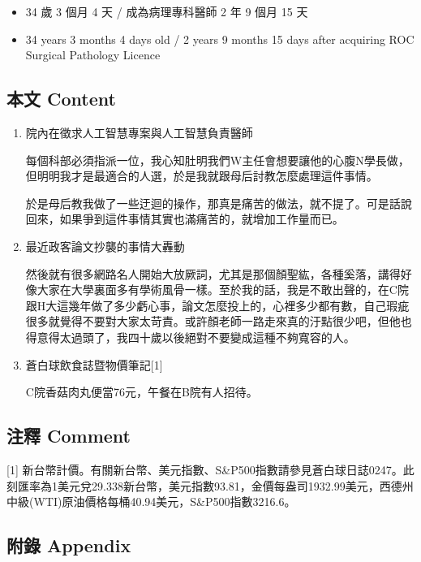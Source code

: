 \documentclass[a5paper, 11pt
]{book}
\providecommand{\tightlist}{%
  \setlength{\itemsep}{0pt}\setlength{\parskip}{0pt}}
\begin{document}
\begin{itemize}
\tightlist
\item
  34 歲 3 個月 4 天 / 成為病理專科醫師 2 年 9 個月 15 天
\item
  34 years 3 months 4 days old / 2 years 9 months 15 days after
  acquiring ROC Surgical Pathology Licence
\end{itemize}

\hypertarget{ux672cux6587-content-56}{%
\subsection{本文 Content}\label{ux672cux6587-content-56}}

\begin{enumerate}
\def\labelenumi{\arabic{enumi}.}
\item
  院內在徵求人工智慧專案與人工智慧負責醫師

  每個科部必須指派一位，我心知肚明我們W主任會想要讓他的心腹N學長做，但明明我才是最適合的人選，於是我就跟母后討教怎麼處理這件事情。

  於是母后教我做了一些迂迴的操作，那真是痛苦的做法，就不提了。可是話說回來，如果爭到這件事情其實也滿痛苦的，就增加工作量而已。
\item
  最近政客論文抄襲的事情大轟動

  然後就有很多網路名人開始大放厥詞，尤其是那個顏聖紘，各種奚落，講得好像大家在大學裏面多有學術風骨一樣。至於我的話，我是不敢出聲的，在C院跟H大這幾年做了多少虧心事，論文怎麼投上的，心裡多少都有數，自己瑕疵很多就覺得不要對大家太苛責。或許顏老師一路走來真的汙點很少吧，但他也得意得太過頭了，我四十歲以後絕對不要變成這種不夠寬容的人。
\item
  蒼白球飲食誌暨物價筆記{[}1{]}

  C院香菇肉丸便當76元，午餐在B院有人招待。
\end{enumerate}

\hypertarget{ux6ce8ux91cb-comment-56}{%
\subsection{注釋 Comment}\label{ux6ce8ux91cb-comment-56}}

{[}1{]}
新台幣計價。有關新台幣、美元指數、S\&P500指數請參見蒼白球日誌0247。此刻匯率為1美元兌29.338新台幣，美元指數93.81，金價每盎司1932.99美元，西德州中級(WTI)原油價格每桶40.94美元，S\&P500指數3216.6。

\hypertarget{ux9644ux9304-appendix-56}{%
\subsection{附錄 Appendix}\label{ux9644ux9304-appendix-56}}
\end{document}
